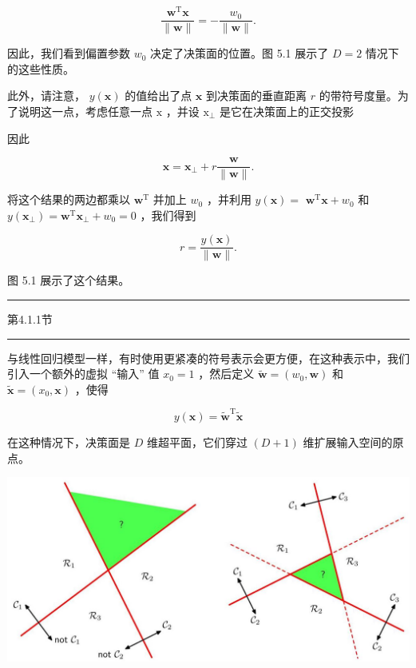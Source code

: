 \documentclass[10pt]{article}
\newcommand{\HRule}{\begin{center}\rule{0.9\linewidth}{0.2mm}\end{center}}
\begin{document}
\[
\frac{{\mathbf{w}}^{\mathrm{T}}\mathbf{x}}{\parallel \mathbf{w}\parallel } =  - \frac{{w}_{0}}{\parallel \mathbf{w}\parallel }. \tag{5.3}
\]

因此，我们看到偏置参数 \({w}_{0}\) 决定了决策面的位置。图 5.1 展示了 \(D = 2\) 情况下的这些性质。

此外，请注意， \(y\left( \mathbf{x}\right)\) 的值给出了点 \(\mathbf{x}\) 到决策面的垂直距离 \(r\) 的带符号度量。为了说明这一点，考虑任意一点 \(\mathrm{x}\) ，并设 \({\mathrm{x}}_{ \bot  }\) 是它在决策面上的正交投影

因此

\[
\mathbf{x} = {\mathbf{x}}_{ \bot  } + r\frac{\mathbf{w}}{\parallel \mathbf{w}\parallel }. \tag{5.4}
\]

将这个结果的两边都乘以 \({\mathbf{w}}^{\mathrm{T}}\) 并加上 \({w}_{0}\) ，并利用 \(y\left( \mathbf{x}\right)  =\)  \({\mathbf{w}}^{\mathrm{T}}\mathbf{x} + {w}_{0}\) 和 \(y\left( {\mathbf{x}}_{ \bot  }\right)  = {\mathbf{w}}^{\mathrm{T}}{\mathbf{x}}_{ \bot  } + {w}_{0} = 0\) ，我们得到

\[
r = \frac{y\left( \mathbf{x}\right) }{\parallel \mathbf{w}\parallel }. \tag{5.5}
\]

图 5.1 展示了这个结果。

\HRule

第4.1.1节

\HRule

与线性回归模型一样，有时使用更紧凑的符号表示会更方便，在这种表示中，我们引入一个额外的虚拟 “输入” 值 \({x}_{0} = 1\) ，然后定义 \(\widetilde{\mathbf{w}} = \left( {{w}_{0},\mathbf{w}}\right)\) 和 \(\widetilde{\mathbf{x}} = \left( {{x}_{0},\mathbf{x}}\right)\) ，使得

\[
y\left( \mathbf{x}\right)  = {\widetilde{\mathbf{w}}}^{\mathrm{T}}\widetilde{\mathbf{x}} \tag{5.6}
\]

在这种情况下，决策面是 \(D\) 维超平面，它们穿过 \(\left( {D + 1}\right)\) 维扩展输入空间的原点。

\begin{center}
\includegraphics[max width=1.0\textwidth]{images/0194e279-9b28-703a-88f4-c3ac21e2010d_153_237_341_1269_581_0.jpg}
\end{center}
\hspace*{3em} 
\end{document}
